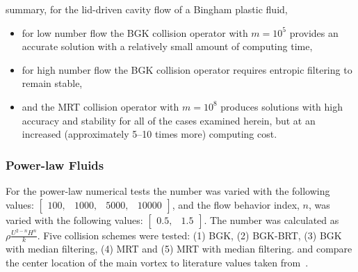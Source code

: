 \begin{figure}
\begin{tabulary}{\linewidth}{c c}
	\end{tabulary}
	\caption{}
	\label{fig:lid-Bn100-Re100}
\end{figure}

\DIFaddend summary, for the lid-driven cavity flow of a Bingham plastic fluid, 
 \begin{itemize} 
    \item for low \DIFdelbegin {}\DIFdelend \DIFaddbegin {}\DIFaddend number flow the BGK collision operator with $m = 10^5$ provides an accurate solution with a relatively small amount of computing time,
    \item for high \DIFdelbegin {}\DIFdelend \DIFaddbegin {}\DIFaddend number flow the BGK collision operator requires entropic filtering to remain stable,
    \item and the MRT collision operator with $m = 10^8$ produces solutions with high accuracy and stability for all of the cases examined herein, but at an increased (approximately 5--10 times more) computing cost.
 \end{itemize}  

\subsubsection{Power-law Fluids}

For the power-law numerical tests the \DIFdelbegin {}\DIFdelend \DIFaddbegin {}\DIFaddend number was varied with the following values: $\begin{bmatrix}100,&1000,&5000,&10000\end{bmatrix}$, and the flow behavior index, $n$, was varied with the following values: $\begin{bmatrix}0.5,&1.5\end{bmatrix}$.
The \DIFdelbegin {}\DIFdelend \DIFaddbegin {}\DIFaddend number was calculated as $\rho \frac{U^{2-n} H^n}{k}$.
Five collision schemes were tested: (1) BGK, (2) BGK-BRT, (3) BGK with median filtering, (4) MRT and (5) MRT with median filtering.
 and  compare the center location of the main vortex to literature values taken from~\citet{li2014simulation}.

